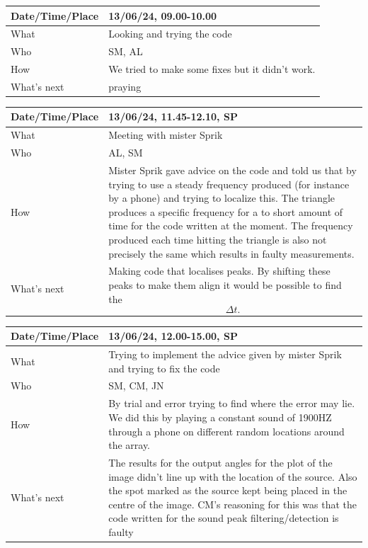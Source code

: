 \documentclass{article}
\begin{document}
\begin{table}[H]
\begin{tabular}{|p{1.5in}|p{4in}|}
\hline
Date/Time/Place &  13/06/24, 09.00-10.00\\ \hline
What            &  Looking and trying the code\\ \hline
Who             &  SM, AL\\ \hline
How             &  We tried to make some fixes but it didn't work.\\ \hline
What's next     &  praying\\ \hline
\end{tabular}
\end{table}

\begin{table}[H]
\begin{tabular}{|p{1.5in}|p{4in}|}
\hline
Date/Time/Place & 13/06/24, 11.45-12.10, SP \\ \hline
What            & Meeting with mister Sprik \\ \hline
Who             & AL, SM \\ \hline
How             & Mister Sprik gave advice on the code and told us that by trying to use a steady frequency produced (for instance by a phone) and trying to localize this. The triangle produces a specific frequency for a to short amount of time for the code written at the moment. The frequency produced each time hitting the triangle is also not precisely the same which results in faulty measurements.   \\ \hline
What's next     & Making code that localises peaks. By shifting these peaks to make them align it would be possible to find the $$\Delta t.$$ \\ \hline
\end{tabular}
\end{table}

\begin{table}[H]
\begin{tabular}{|p{1.5in}|p{4in}|}
\hline
Date/Time/Place & 13/06/24, 12.00-15.00, SP \\ \hline
What            & Trying to implement the advice given by mister Sprik and trying to fix the code \\ \hline
Who             & SM, CM, JN \\ \hline
How             & By trial and error trying to find where the error may lie. We did this by playing a constant sound of 1900HZ through a phone on different random locations around the array. \\ \hline
What's next     &  The results for the output angles for the plot of the image didn't line up with the location of the source. Also the spot marked as the source kept being placed in the centre of the image. CM's reasoning for this was that the code written for the sound peak filtering/detection is faulty  \\ \hline
\end{tabular}
\end{table}
\end{document}
